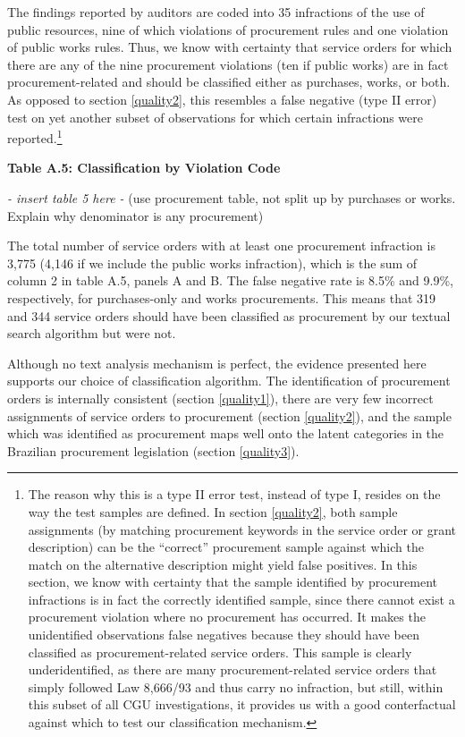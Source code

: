 \documentclass[]{article}
\let\rmarkdownfootnote\footnote%
\def\footnote{\protect\rmarkdownfootnote}
\theoremstyle{definition}
\theoremstyle{definition}
\theoremstyle{definition}
\theoremstyle{remark}
\begin{document}
The findings reported by auditors are coded into 35 infractions of the
use of public resources, nine of which violations of procurement rules
and one violation of public works rules. Thus, we know with certainty
that service orders for which there are any of the nine procurement
violations (ten if public works) are in fact procurement-related and
should be classified either as purchases, works, or both. As opposed to
section \ref{quality2}, this resembles a false negative (type II error)
test on yet another subset of observations for which certain infractions
were reported.\footnote{The reason why this is a type II error test,
  instead of type I, resides on the way the test samples are defined. In
  section \ref{quality2}, both sample assignments (by matching
  procurement keywords in the service order or grant description) can be
  the ``correct'' procurement sample against which the match on the
  alternative description might yield false positives. In this section,
  we know with certainty that the sample identified by procurement
  infractions is in fact the correctly identified sample, since there
  cannot exist a procurement violation where no procurement has
  occurred. It makes the unidentified observations false negatives
  because they should have been classified as procurement-related
  service orders. This sample is clearly underidentified, as there are
  many procurement-related service orders that simply followed Law
  8,666/93 and thus carry no infraction, but still, within this subset
  of all CGU investigations, it provides us with a good conterfactual
  against which to test our classification mechanism.}

\textbf{Table A.5: Classification by Violation Code}

\emph{- insert table 5 here -} (use procurement table, not split up by
purchases or works. Explain why denominator is any procurement)

The total number of service orders with at least one procurement
infraction is 3,775 (4,146 if we include the public works infraction),
which is the sum of column 2 in table A.5, panels A and B. The false
negative rate is 8.5\% and 9.9\%, respectively, for purchases-only and
works procurements. This means that 319 and 344 service orders should
have been classified as procurement by our textual search algorithm but
were not.

Although no text analysis mechanism is perfect, the evidence presented
here supports our choice of classification algorithm. The identification
of procurement orders is internally consistent (section \ref{quality1}),
there are very few incorrect assignments of service orders to
procurement (section \ref{quality2}), and the sample which was
identified as procurement maps well onto the latent categories in the
Brazilian procurement legislation (section \ref{quality3}).
\end{document}
